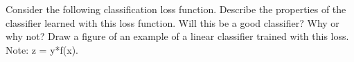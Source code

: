 Consider the following classification loss function. Describe the properties of the classifier learned with this loss function. Will this be a good classifier? Why or why not? Draw a figure of an example of a linear classifier trained with this loss. Note: z = y*f(x).


